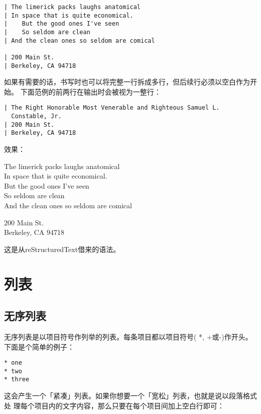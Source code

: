 \documentclass[fancyhdr,bookmark]{ctexbook}
\begin{document}
\begin{lstlisting}
| The limerick packs laughs anatomical
| In space that is quite economical.
|    But the good ones I've seen
|    So seldom are clean
| And the clean ones so seldom are comical

| 200 Main St.
| Berkeley, CA 94718
\end{lstlisting}

如果有需要的话，书写时也可以将完整一行拆成多行，但后续行必须以空白作为开始。
下面范例的前两行在输出时会被视为一整行：

\begin{lstlisting}
| The Right Honorable Most Venerable and Righteous Samuel L.
  Constable, Jr.
| 200 Main St.
| Berkeley, CA 94718
\end{lstlisting}

效果：

The limerick packs laughs anatomical\\In space that is quite
economical.\\\hspace*{0.333em}\hspace*{0.333em}\hspace*{0.333em}But the
good ones I've
seen\\\hspace*{0.333em}\hspace*{0.333em}\hspace*{0.333em}So seldom are
clean\\And the clean ones so seldom are comical

200 Main St.\\Berkeley, CA 94718

这是从reStructuredText借来的语法。

\section{列表}\label{ux5217ux8868}

\subsection{无序列表}\label{ux65e0ux5e8fux5217ux8868}

无序列表是以项目符号作列举的列表。每条项目都以项目符号( *, +或-)作开头。
下面是个简单的例子：

\begin{lstlisting}
* one
* two
* three
\end{lstlisting}

这会产生一个「紧凑」列表。如果你想要一个「宽松」列表，也就是说以段落格式处
理每个项目内的文字内容，那么只要在每个项目间加上空白行即可：
\end{document}
